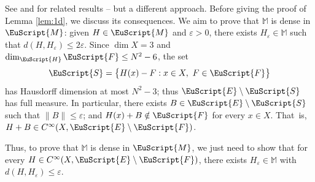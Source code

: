 \documentclass[10pt]{amsart}
\let\pazocal\EuScript
\let\sep:
\theoremstyle{definition}
\newcommand{\FF}{\pazocal{F}}
\newcommand{\EE}{\pazocal{E}}
\newcommand{\MM}{\pazocal{M}}
\newcommand{\HH}{\pazocal{H}}
\newcommand{\SSS}{{\pazocal{S}}}
\newcommand{\Mm}{\mathbb{M}}
\let\epsi\varepsilon
\begin{document}
See \cite[\S2]{AS78} and \cite[\S3]{DE99} for related results -- but a different approach.
Before giving the proof of Lemma \ref{lem:1d}, we discuss its consequences. We aim to prove that $\Mm$ is dense in $\MM$: given $H \in \MM$ and $\epsi > 0$, there exists $H_\epsi \in \Mm$ such that $d(H,H_\epsi) \leq 2\epsi$. Since $\dim X = 3$ and $\dim_\HH \FF \leq N^2-6$, the set
\begin{equation*}
\SSS = \bigl\{ H(x) - F \sep x \in X, \ F \in \FF\bigr\}
\end{equation*}
has Hausdorff dimension at most $N^2-3$; thus $\EE \setminus \SSS$ has full measure. In particular, there exists $B \in \EE \setminus \SSS$ such that $\| B \| \leq \epsi$; and $H(x) + B \notin \FF$ for every $x \in X$. That~is, $H+B \in C^\infty(X,\EE\setminus \FF)$.

Thus, to prove that $\Mm$ is dense in $\MM$, we just need to show that for every $H \in C^\infty(X,\EE\setminus\FF)$, there exists $H_\epsi \in \Mm$ with $d(H,H_\epsi) \leq \epsi$.
\end{document}
